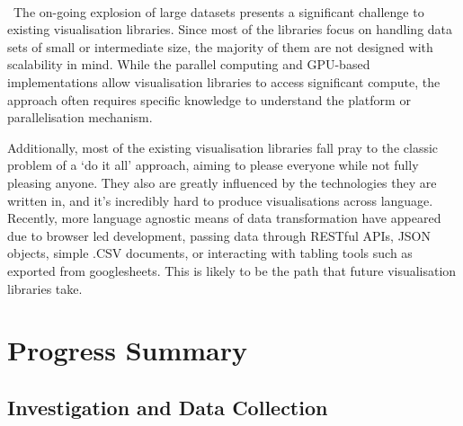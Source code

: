 \documentclass[a4paper,11pt,titlepage]{article}
\begin{document}
		\\\
		The on-going explosion of large datasets presents a significant challenge to existing visualisation libraries. Since most of the libraries focus on handling data sets of small or intermediate size, the majority of them are not designed with scalability in mind. While the parallel computing and GPU-based implementations allow visualisation libraries to access significant compute, the approach often requires specific knowledge to understand the platform or parallelisation mechanism.
		\par 
		Additionally, most of the existing visualisation libraries fall pray to the classic problem of a `do it all' approach, aiming to please everyone while not fully pleasing anyone. They also are greatly influenced by the technologies they are written in, and it's incredibly hard to produce visualisations across language. Recently, more language agnostic means of data transformation have appeared due to browser led development, passing data through RESTful APIs, JSON objects, simple .CSV documents, or interacting with tabling tools such as exported from googlesheets. This is likely to be the path that future visualisation libraries take.

\section{Progress Summary}
	\subsection{Investigation and Data Collection}
\end{document}
